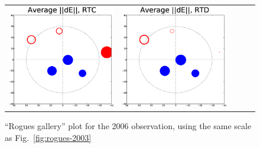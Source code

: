\documentclass[]{aa}
\begin{document}
\begin{figure}
\begin{tabular}{@{}c@{}c@{}c@{}c@{}c@{}}
\includegraphics[width=\roguewidth]{o2006_dE_antC} &
\includegraphics[width=\roguewidth]{o2006_dE_antD} 
\end{tabular}
\caption{\label{fig:rogues-2006}``Rogues gallery'' plot for the 2006 observation, using the same scale as Fig.~\ref{fig:rogues-2003}}
\end{figure}
\end{document}
